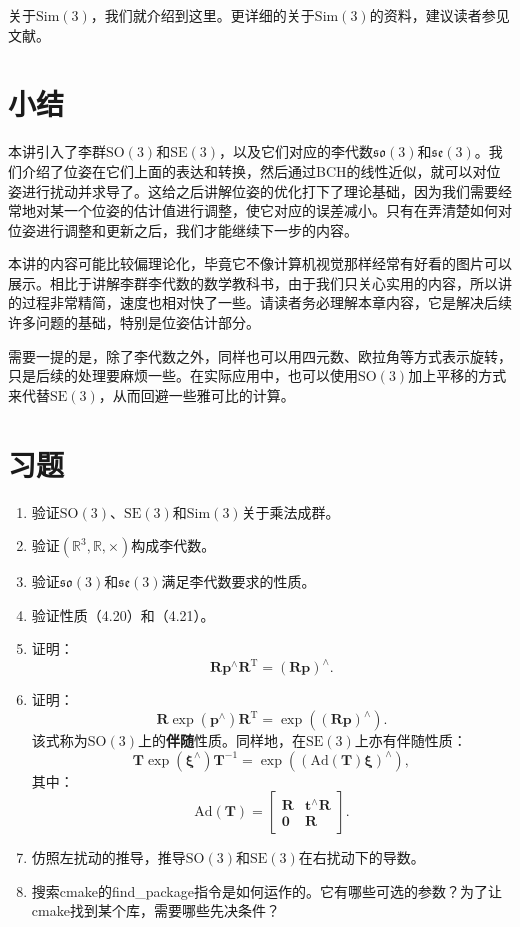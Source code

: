 关于$\mathrm{Sim}(3)$，我们就介绍到这里。更详细的关于$\mathrm{Sim}(3)$的资料，建议读者参见文献\cite{Strasdat2012a}。


\section{小结}
本讲引入了李群$\mathrm{SO}(3)$和$\mathrm{SE}(3)$，以及它们对应的李代数$\mathfrak{so}(3)$和$\mathfrak{se}(3)$。我们介绍了位姿在它们上面的表达和转换，然后通过BCH的线性近似，就可以对位姿进行扰动并求导了。这给之后讲解位姿的优化打下了理论基础，因为我们需要经常地对某一个位姿的估计值进行调整，使它对应的误差减小。只有在弄清楚如何对位姿进行调整和更新之后，我们才能继续下一步的内容。

本讲的内容可能比较偏理论化，毕竟它不像计算机视觉那样经常有好看的图片可以展示。相比于讲解李群李代数的数学教科书，由于我们只关心实用的内容，所以讲的过程非常精简，速度也相对快了一些。请读者务必理解本章内容，它是解决后续许多问题的基础，特别是位姿估计部分。

需要一提的是，除了李代数之外，同样也可以用四元数、欧拉角等方式表示旋转，只是后续的处理要麻烦一些。在实际应用中，也可以使用$\mathrm{SO}(3)$加上平移的方式来代替$\mathrm{SE}(3)$，从而回避一些雅可比的计算。

\section*{习题}
\begin{enumerate}
	\item 验证$\mathrm{SO}(3)$、$\mathrm{SE}(3)$和$\mathrm{Sim}(3)$关于乘法成群。
	\item 验证$( \mathbb{R}^3, \mathbb{R}, \times )$构成李代数。
	\item 验证$\mathfrak{so}(3)$和$\mathfrak{se}(3)$满足李代数要求的性质。
	\item 验证性质（4.20）和（4.21）。
	\item 证明：\[
	\bm{R} \bm{p}^\wedge \bm{R}^\mathrm{T} = (\bm{Rp})^\wedge .\]
	\item 证明：\[
	\bm{R} \exp( \bm{p}^\wedge) \bm{R}^\mathrm{T} = \exp( (\bm{Rp})^\wedge ).\] 该式称为$\mathrm{SO}(3)$上的\textbf{伴随}性质。同样地，在$\mathrm{SE}(3)$上亦有伴随性质：
	\begin{equation}
	\bm{T} \exp(\bm{\xi}^\wedge)\bm{T}^{-1} = \exp \left( \left( \mathrm{Ad}(\bm{T}) \bm{\xi} \right) ^\wedge \right),
	\end{equation}
	其中：
	\begin{equation}
	\label{eq:adjSE3}
	\mathrm{Ad} ( \bm{T} ) = \left[ {\begin{array}{*{20}{c}}
		\bm{R} &{{ \bm{t} ^ \wedge } \bm{R} }\\
		\bm{0} & \bm{R}
		\end{array}} \right]. 
	\end{equation}
	\item 仿照左扰动的推导，推导$\mathrm{SO}(3)$和$\mathrm{SE}(3)$在右扰动下的导数。
	\item 搜索cmake的find\_package指令是如何运作的。它有哪些可选的参数？为了让cmake找到某个库，需要哪些先决条件？
\end{enumerate}
